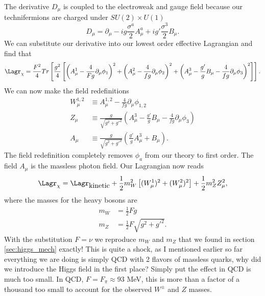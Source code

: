 The derivative $D_\mu$ is coupled to the electroweak and gauge field because our technifermions are charged under $SU(2)\times U(1)$
\begin{equation}
  D_\mu=\partial_\mu - ig\frac{\sigma^a}{2}A^a_\mu+ig'\frac{\sigma^3}{2}B_\mu.
\end{equation}
We can substitute our derivative into our lowest order effective Lagrangian and find that\begin{equation}
  \Lagr_{\chi}=\frac{F^2}{4}Tr\left[\frac{g^2}{4}\left[\left(A^1_\mu-\frac{4}{Fg}\partial_\mu\phi_1\right)^2 + \left(A^2_\mu-\frac{4}{fg}\partial_\mu\phi_2\right)^2 + 
  \left(A^3_\mu-\frac{g'}{g}B_\mu-\frac{4}{fg}\partial_\mu\phi_3\right)^2\right]\right].
\end{equation}
We can now make the field redefinitions
\begin{equation}
  \begin{aligned}
    W^{1,2}_\mu &\equiv A^{1,2}_\mu - \frac{4}{fg}\partial_\mu\phi_{1,2} \\
    Z_\mu &\equiv \frac{g}{\sqrt{g^2+g'^2}}\left(A^3_\mu - \frac{g'}{g}B_\mu - \frac{4}{fg}\partial_\mu\phi_3\right) \\
    A_\mu &\equiv \frac{g}{\sqrt{g^2+g'^2}}\left(\frac{g'}{g}A^3_\mu+B_\mu\right).
  \end{aligned}
\end{equation}
The field redefinition completely removes $\phi_a$ from our theory to first order.
The field $A_\mu$ is the massless photon field.
Our Lagrangian now reads
\begin{equation}
  \Lagr_{\chi}=\Lagr_{\mbox{kinetic}}+\frac{1}{2}m_W^2\left[(W^1_\mu)^2+(W_\mu^2)^2\right]+\frac{1}{2}m_Z^2Z^2_\mu,
\end{equation}
where the masses for the heavy bosons are
\begin{equation}
  \begin{aligned}
    m_W&=\frac{1}{2}Fg \\
    m_Z&=\frac{1}{2}F\sqrt{g^2+g'^2}.
  \end{aligned}
\end{equation}
With the substitution $F=\nu$ we reproduce $m_W$ and $m_Z$ that we found in section \ref{sec:higgs_mech} exactly!
This is quite a shock, as I mentioned earlier so far everything we are doing is simply QCD with 2 flavors of massless quarks, why did we introduce the Higgs field in the first place?
Simply put the effect in QCD is much too small.
In QCD, $F=F_\pi\approx93$ MeV, this is more than a factor of a thousand too small to account for the observed $W^\pm$ and $Z$ masses.

